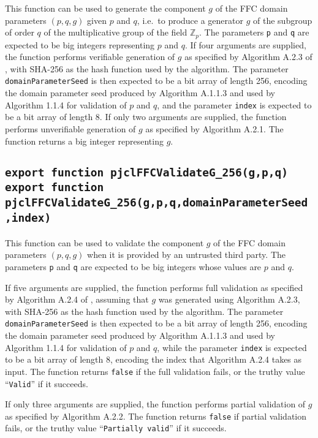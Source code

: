 \documentclass[12pt]{article}
\begin{document}
This function can be used to generate the component $g$ of the FFC domain parameters $(p,q,g)$
given $p$ and $q$, i.e.\ to produce a generator $g$ of the subgroup of order $q$ of the
multiplicative group of the field $\mathbb{Z}_p$.  The parameters {\tt p} and {\tt q} are expected
to be big integers representing $p$ and $q$.  If four arguments are supplied, the function
performs verifiable generation of $g$ as specified by Algorithm A.2.3 of \cite{DSS-4},
with SHA-256 as the hash function used by the algorithm. 
The parameter {\tt domainParameterSeed} is then expected to be a bit array of length 256, 
encoding the domain parameter seed produced by Algorithm A.1.1.3 and used by Algorithm 1.1.4
for validation of $p$ and $q$, and the parameter {\tt index}
is expected to be a bit array of length 8.
If only two arguments are supplied, the function performs unverifiable generation of $g$
as specified by Algorithm A.2.1.
The function returns a big integer representing $g$.

\subsection{\tt export function pjclFFCValidateG\_256(g,p,q)\\export function pjclFFCValidateG\_256(g,p,q,domainParameterSeed,index)}

This function can be used to validate the component $g$ of the FFC domain parameters $(p,q,g)$
when it is provided by an untrusted third party.
The parameters {\tt p} and {\tt q} are expected to be big integers whose values are $p$ and $q$.

If five arguments are supplied, the function performs 
full validation as specified by Algorithm A.2.4 of \cite{DSS-4},
assuming that $g$ was generated using Algorithm A.2.3, with SHA-256 as the hash function used by the algorithm. 
The parameter {\tt domainParameterSeed} is then expected to be a bit array of length 256, 
encoding the domain parameter seed produced by Algorithm A.1.1.3 and used by Algorithm 1.1.4
for validation of $p$ and $q$, while the parameter {\tt index}
is expected to be a bit array of length 8, encoding the index that Algorithm A.2.4 takes as input.
The function returns {\tt false} if the full validation fails, or 
the truthy value ``{\tt Valid}'' if it succeeds.

If only three arguments are supplied, the function performs partial validation of $g$
as specified by Algorithm A.2.2.
The function returns {\tt false} if partial validation fails, or 
the truthy value ``{\tt Partially valid}'' if it succeeds.
\end{document}
